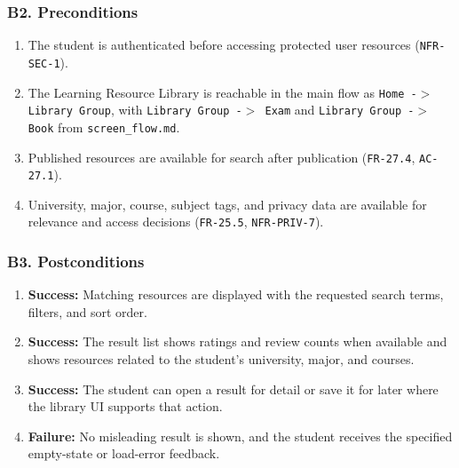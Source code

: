 \documentclass[12pt]{article}
\begin{document}
\hypertarget{sec:b2-preconditions}{}
\subsubsection*{B2. Preconditions}
\par\medskip

\begin{enumerate}
\item The student is authenticated before accessing protected user resources (\texttt{NFR-SEC-1}).
\item The Learning Resource Library is reachable in the main flow as \texttt{Home -$>$ Library Group}, with \texttt{Library Group -$>$ Exam} and \texttt{Library Group -$>$ Book} from \texttt{screen\_flow.md}.
\item Published resources are available for search after publication (\texttt{FR-27.4}, \texttt{AC-27.1}).
\item University, major, course, subject tags, and privacy data are available for relevance and access decisions (\texttt{FR-25.5}, \texttt{NFR-PRIV-7}).
\end{enumerate}
\par\medskip

\hypertarget{sec:b3-postconditions}{}
\subsubsection*{B3. Postconditions}
\par\medskip

\begin{enumerate}
\item \textbf{Success:} Matching resources are displayed with the requested search terms, filters, and sort order.
\item \textbf{Success:} The result list shows ratings and review counts when available and shows resources related to the student's university, major, and courses.
\item \textbf{Success:} The student can open a result for detail or save it for later where the library UI supports that action.
\item \textbf{Failure:} No misleading result is shown, and the student receives the specified empty-state or load-error feedback.
\end{enumerate}
\par\medskip
\end{document}

